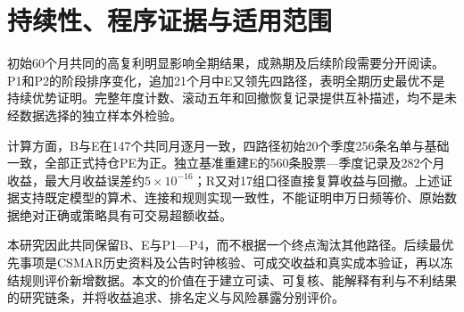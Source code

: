 \section{持续性、程序证据与适用范围}
初始60个月共同的高复利明显影响全期结果，成熟期及后续阶段需要分开阅读。P1和P2的阶段排序变化，追加21个月中E又领先四路径，表明全期历史最优不是持续优势证明。完整年度计数、滚动五年和回撤恢复记录提供互补描述，均不是未经数据选择的独立样本外检验。

计算方面，B与E在147个共同月逐月一致，四路径初始20个季度256条名单与基础一致，全部正式持仓PE为正。独立基准重建E的560条股票—季度记录及282个月收益，最大月收益误差约$5\times10^{-16}$；R又对17组口径直接复算收益与回撤。上述证据支持既定模型的算术、连接和规则实现一致性，不能证明申万日频等价、原始数据绝对正确或策略具有可交易超额收益。

本研究因此共同保留B、E与P1—P4，而不根据一个终点淘汰其他路径。后续最优先事项是CSMAR历史资料及公告时钟核验、可成交收益和真实成本验证，再以冻结规则评价新增数据。本文的价值在于建立可读、可复核、能解释有利与不利结果的研究链条，并将收益追求、排名定义与风险暴露分别评价。

